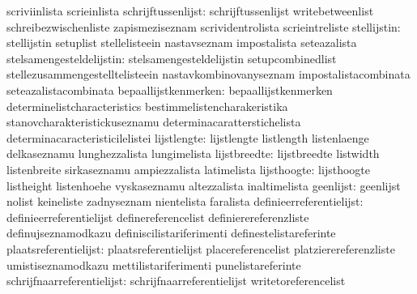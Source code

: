                                   scriviinlista                    scrieinlista
             schrijftussenlijst:  schrijftussenlijst               writebetweenlist
                                  schreibezwischenliste            zapismeziseznam
                                  scrividentrolista                scrieintreliste
                    stellijstin:  stellijstin                      setuplist
                                  stellelisteein                   nastavseznam
                                  impostalista                     seteazalista
       stelsamengesteldelijstin:  stelsamengesteldelijstin         setupcombinedlist
                                  stellezusammengestelltelisteein  nastavkombinovanyseznam
                                  impostalistacombinata            seteazalistacombinata
           bepaallijstkenmerken:  bepaallijstkenmerken             determinelistcharacteristics
                                  bestimmelistencharakeristika     stanovcharakteristickuseznamu
                                  determinacaratterstichelista     determinacaracteristicilelistei
                    lijstlengte:  lijstlengte                      listlength
                                  listenlaenge                     delkaseznamu
                                  lunghezzalista                   lungimelista
                   lijstbreedte:  lijstbreedte                     listwidth
                                  listenbreite                     sirkaseznamu
                                  ampiezzalista                    latimelista
                    lijsthoogte:  lijsthoogte                      listheight
                                  listenhoehe                      vyskaseznamu
                                  altezzalista                     inaltimelista
                      geenlijst:  geenlijst                        nolist
                                  keineliste                       zadnyseznam
                                  nientelista                      faralista
        definieerreferentielijst: definieerreferentielijst         definereferencelist
                                  definierereferenzliste           definujseznamodkazu
                                  definiscilistariferimenti        definestelistareferinte
           plaatsreferentielijst: plaatsreferentielijst            placereferencelist
                                  platzierereferenzliste           umistiseznamodkazu
                                  mettilistariferimenti            punelistareferinte
      schrijfnaarreferentielijst: schrijfnaarreferentielijst       writetoreferencelist
